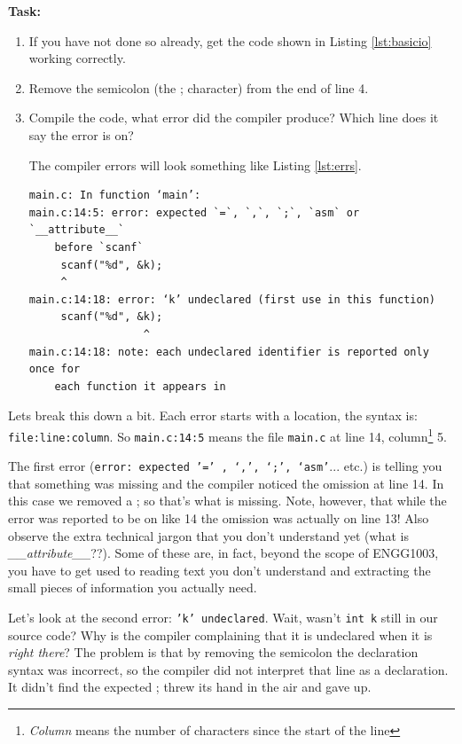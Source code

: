 \documentclass{lab}
\begin{document}
\textbf{Task:}
\begin{enumerate}
	\item If you have not done so already, get the code shown in Listing \ref{lst:basicio} working correctly.
	\item Remove the semicolon (the ; character) from the end of line 4.
	\item Compile the code, what error did the compiler produce? Which line does it say the error is on?
	
	The compiler errors will look something like Listing \ref{lst:errs}.
	
	\begin{lstlisting}[caption=The multiple errors produced by removing a \textit{single} semicolon.,label=lst:errs,basicstyle=\ttfamily,frame=single]
main.c: In function ‘main’:
main.c:14:5: error: expected `=`, `,`, `;`, `asm` or `__attribute__`
	before `scanf`
     scanf("%d", &k);
     ^
main.c:14:18: error: ‘k’ undeclared (first use in this function)
     scanf("%d", &k);
                  ^
main.c:14:18: note: each undeclared identifier is reported only once for
	each function it appears in
	\end{lstlisting}
\end{enumerate}
	
Lets break this down a bit. Each error starts with a location, the syntax is: \texttt{{file}:{line}:{column}}. So \texttt{main.c:14:5} means the file \texttt{main.c} at line 14, column\footnote{\textit{Column} means the number of characters since the start of the line} 5.

The first error (\texttt{error: expected '=' , ‘,’, ‘;’, ‘asm'}... etc.) is telling you that something was missing and the compiler noticed the omission at line 14. In this case we removed a ; so that's what is missing. Note, however, that while the error was reported to be on like 14 the omission was actually on line 13! Also observe the extra technical jargon that you don't understand yet (what is \textit{\_\_attribute\_\_}??). Some of these are, in fact, beyond the scope of ENGG1003, you have to get used to reading text you don't understand and extracting the small pieces of information you actually need.

Let's look at the second error: \texttt{'k' undeclared}. Wait, wasn't \texttt{int k} still in our source code? Why is the compiler complaining that it is undeclared when it is \textit{right there}? The problem is that by removing the semicolon the declaration syntax was incorrect, so the compiler did not interpret that line as a declaration. It didn't find the expected ; threw its hand in the air and gave up.
\end{document}
